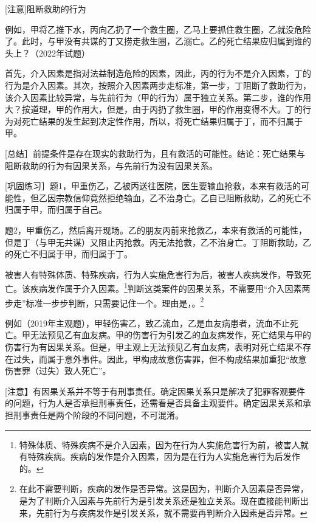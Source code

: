 [注意]阻断救助的行为

例如，甲将乙推下水，丙向乙扔了一个救生圈，乙马上要抓住救生圈，乙就没危险了。此时，与甲没有共谋的丁又捞走救生圈，乙溺亡。乙的死亡结果应归属到谁的头上？（2022年试题）

首先，介入因素是指对法益制造危险的因素，因此，丙的行为不是介入因素，丁的行为是介入因素。其次，按照介入因素两步走标准，第一步，丁阻断了救助行为，该介入因素比较异常，与先前行为（甲的行为）属于独立关系。第二步，谁的作用大？按道理，甲的作用大，但是，由于丙扔了救生圈，甲的作用变得不大。丁的行为对死亡结果的发生起到决定性作用，所以，将死亡结果归属于丁，而不归属于甲。

[总结］前提条件是存在现实的救助行为，且有救活的可能性。结论：死亡结果与阻断救助的行为有因果关系，与先前行为没有因果关系。

[巩固练习］题1，甲重伤乙，乙被丙送往医院，医生要输血抢救，本来有救活的可能性，但乙因宗教信仰竟然拒绝输血，乙不治身亡。乙自已阻断救助，乙的死亡不归属于甲，而归属于自己。

题2，甲重伤乙，然后离开现场。乙的朋友丙前来抢救乙，本来有救活的可能性，但是丁（与甲无共谋）又阻止丙抢救。丙无法抢救，乙不治身亡。丁阻断救助，乙的死亡不归属于甲，而归属于丁。


被害人有特殊体质、特殊疾病，行为人实施危害行为后，被害人疾病发作，导致死亡。该疾病发作属于介入因素。\footnote{特殊体质、特殊疾病不是介入因素，因为在行为人实施危害行为前，被害人就有特殊疾病。疾病的发作是介入因素，因为是在行为人实施危害行为后发作的。}判断这类案件的因果关系，不需要用“介入因素两步走”标准一步步判断，只需要记住一个。理由是，。\footnote{在此不需要判断，疾病的发作是否异常。这是因为，判断介入因素是否异常，是为了判断介入因素与先前行为是引发关系还是独立关系。现在直接能判断出来，先前行为与疾病发作是引发关系，就不需要再判断介入因素是否异常。}

例如（2019年主观题），甲轻伤害乙，致乙流血，乙是血友病患者，流血不止死亡。甲无法预见乙有血友病。甲的伤害行为引发乙的血友病发作，死亡结果与甲的伤害行为有因果关系。但是，甲主观上无法预见乙有血友病，表明对死亡结果不存在过失，而属于意外事件。因此，甲构成故意伤害罪，但不构成结果加重犯“故意伤害罪（过失）致人死亡”。

[注意】有因果关系并不等于有刑事责任。确定因果关系只是解决了犯罪客观要件的问题，行为人是否承担刑事责任，还需看是否具备主观要件。确定因果关系和承担刑事责任是两个阶段的不同问题，不可混淆。

